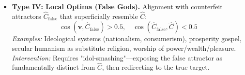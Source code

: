 \documentclass[11pt,a4paper]{article}
\theoremstyle{definition}
\theoremstyle{remark}
\begin{document}
\begin{itemize}
    \item \textbf{Type IV: Local Optima (False Gods).} Alignment with counterfeit attractors \(\hat{C}_{\text{false}}\) that superficially resemble \(\hat{C}\):
    \begin{equation}
        \cos(\mathbf{v}, \hat{C}_{\text{false}}) > 0.5, \quad \cos(\hat{C}_{\text{false}}, \hat{C}) < 0.5
    \end{equation}
    \textit{Examples:} Ideological systems (nationalism, consumerism), prosperity gospel, secular humanism as substitute religion, worship of power/wealth/pleasure.\\
    \textit{Intervention:} Requires "idol-smashing"—exposing the false attractor as fundamentally distinct from \(\hat{C}\), then redirecting to the true target.
\end{itemize}
\end{document}
